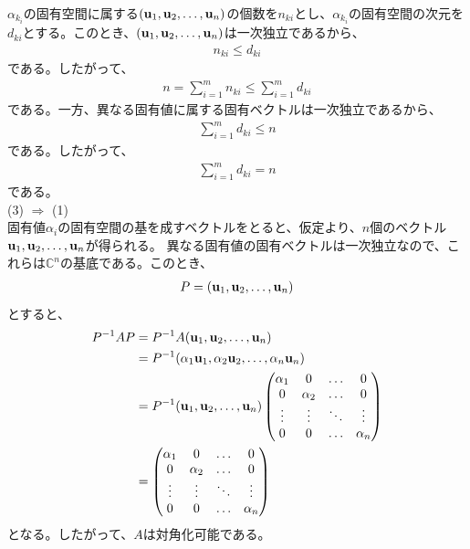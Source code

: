 \documentclass[a4paper,11pt]{jsarticle}
\numberwithin{equation}{section}
\begin{document}
$\alpha_{k_i}$の固有空間に属する$(\vb{u}_1, \vb{u}_2, \dots, \vb{u}_n)$の個数を$n_{ki}$とし、$\alpha_{k_i}$の固有空間の次元を$d_{ki}$とする。このとき、$(\vb{u}_1, \vb{u}_2, \dots, \vb{u}_n)$は一次独立であるから、
\begin{align}
  n_{ki} \leq  d_{ki}
\end{align}
である。したがって、
\begin{align}
  n = \sum_{i=1}^{m} n_{ki} \leq \sum_{i=1}^{m} d_{ki}
\end{align}
である。一方、異なる固有値に属する固有ベクトルは一次独立であるから、
\begin{align}
  \sum_{i=1}^{m} d_{ki} \leq n
\end{align}
である。したがって、
\begin{align}
  \sum_{i=1}^{m} d_{ki} = n
\end{align}
である。\\
(3) $\Rightarrow$ (1)\\
固有値$\alpha_i$の固有空間の基を成すベクトルをとると、仮定より、$n$個のベクトル$\vb{u}_1, \vb{u}_2, \dots, \vb{u}_n$が得られる。
異なる固有値の固有ベクトルは一次独立なので、これらは$\mathbb{C}^n$の基底である。このとき、
\begin{align}
  P = (\vb{u}_1, \vb{u}_2, \dots, \vb{u}_n)
\end{align}
とすると、
\begin{align}
  P^{-1}AP &= P^{-1}A(\vb{u}_1, \vb{u}_2, \dots, \vb{u}_n)\\
  &= P^{-1}(\alpha_1\vb{u}_1, \alpha_2\vb{u}_2, \dots, \alpha_n\vb{u}_n)\\
  &= P^{-1}(\vb{u}_1, \vb{u}_2, \dots, \vb{u}_n)
  \begin{pmatrix}
    \alpha_1 & 0 & \dots & 0\\
    0 & \alpha_2 & \dots & 0\\
    \vdots & \vdots & \ddots & \vdots\\
    0 & 0 & \dots & \alpha_n
  \end{pmatrix}\\
  &=
  \begin{pmatrix}
    \alpha_1 & 0 & \dots & 0\\
    0 & \alpha_2 & \dots & 0\\
    \vdots & \vdots & \ddots & \vdots\\
    0 & 0 & \dots & \alpha_n
  \end{pmatrix}
\end{align}
となる。したがって、$A$は対角化可能である。\hfill\qedsymbol\\
\end{document}
